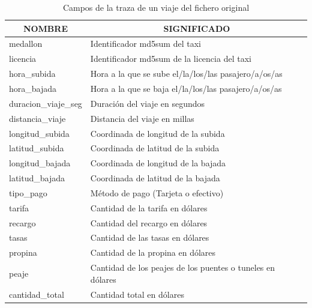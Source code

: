 \begin{table}[htp!]
\centering
\caption{Campos de la traza de un viaje del fichero original}
\label{tab:trazaOrig}
\begin{tabular}{|l|l|}
\hline
\multicolumn{1}{|c|}{\textbf{NOMBRE}} & \multicolumn{1}{c|}{\textbf{SIGNIFICADO}}                  \\ \hline
medallon                              & Identificador md5sum del taxi                              \\ \hline
licencia                              & Identificador md5sum de la licencia del taxi               \\ \hline
hora\_subida                          & Hora a la que se sube el/la/los/las pasajero/a/os/as       \\ \hline
hora\_bajada                          & Hora a la que se baja el/la/los/las pasajero/a/os/as       \\ \hline
duracion\_viaje\_seg                  & Duración del viaje en segundos                             \\ \hline
distancia\_viaje                      & Distancia del viaje en millas                              \\ \hline
longitud\_subida                      & Coordinada de longitud de la subida                        \\ \hline
latitud\_subida                       & Coordinada de latitud de la subida                         \\ \hline
longitud\_bajada                      & Coordinada de longitud de la bajada                        \\ \hline
latitud\_bajada                       & Coordinada de latitud de la bajada                         \\ \hline
tipo\_pago                            & Método de pago (Tarjeta o efectivo)                        \\ \hline
tarifa                                & Cantidad de la tarifa en dólares                           \\ \hline
recargo                               & Cantidad del recargo en dólares                            \\ \hline
tasas                                 & Cantidad de las tasas en dólares                           \\ \hline
propina                               & Cantidad de la propina en dólares                          \\ \hline
peaje                                 & Cantidad de los peajes de los puentes o tuneles en dólares \\ \hline
cantidad\_total                       & Cantidad total en dólares                                  \\ \hline
\end{tabular}
\end{table}

